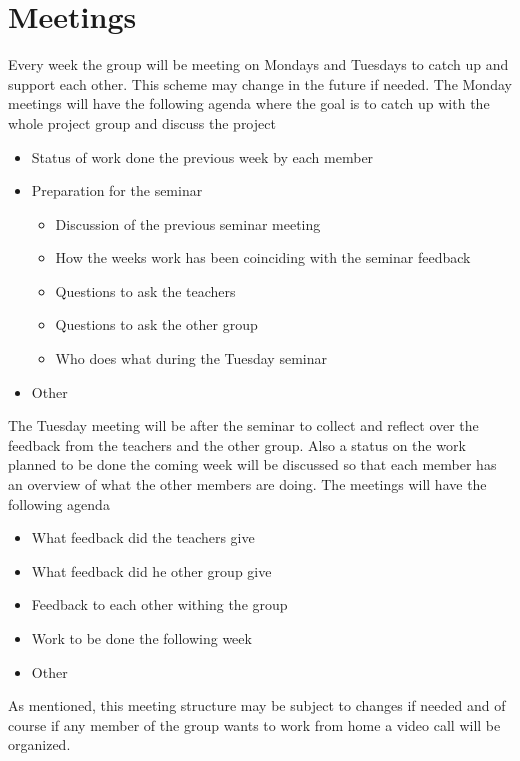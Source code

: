 \section*{Meetings}
Every week the group will be meeting on Mondays and Tuesdays to catch up and support each other. This scheme may change in the future if needed. 
The Monday meetings will have the following agenda where the goal is to catch up with the whole project group and discuss the project
\begin{itemize}
    \item Status of work done the previous week by each member
    \item Preparation for the seminar
    \begin{itemize}
        \item Discussion of the previous seminar meeting
        \item How the weeks work has been coinciding with the seminar feedback
        \item Questions to ask the teachers
        \item Questions to ask the other group
        \item Who does what during the Tuesday seminar
    \end{itemize}
    \item Other
\end{itemize}
The Tuesday meeting will be after the seminar to collect and reflect over the 
feedback from the teachers and the other group. Also a status on the work planned to be done 
the coming week will be discussed so that each member has an overview of what 
the other members are doing. The meetings will have the following agenda
\begin{itemize}
    \item What feedback did the teachers give
    \item What feedback did he other group give 
    \item Feedback to each other withing the group
    \item Work to be done the following week
    \item Other 
\end{itemize}
As mentioned, this meeting structure may be subject to changes if needed and of course if any member of the group wants to work from home a video call will be organized. 











